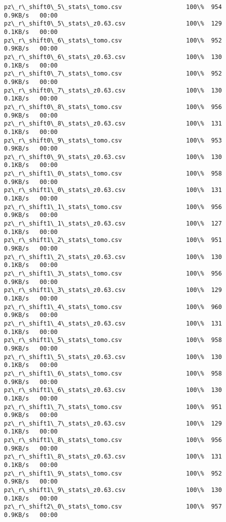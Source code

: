 \documentclass[11pt]{article}
\begin{document}
\begin{Verbatim}[commandchars=\\\{\}]
pz\_r\_shift0\_5\_stats\_tomo.csv                  100\%  954     0.9KB/s   00:00    
pz\_r\_shift0\_5\_stats\_z0.63.csv                 100\%  129     0.1KB/s   00:00    
pz\_r\_shift0\_6\_stats\_tomo.csv                  100\%  952     0.9KB/s   00:00    
pz\_r\_shift0\_6\_stats\_z0.63.csv                 100\%  130     0.1KB/s   00:00    
pz\_r\_shift0\_7\_stats\_tomo.csv                  100\%  952     0.9KB/s   00:00    
pz\_r\_shift0\_7\_stats\_z0.63.csv                 100\%  130     0.1KB/s   00:00    
pz\_r\_shift0\_8\_stats\_tomo.csv                  100\%  956     0.9KB/s   00:00    
pz\_r\_shift0\_8\_stats\_z0.63.csv                 100\%  131     0.1KB/s   00:00    
pz\_r\_shift0\_9\_stats\_tomo.csv                  100\%  953     0.9KB/s   00:00    
pz\_r\_shift0\_9\_stats\_z0.63.csv                 100\%  130     0.1KB/s   00:00    
pz\_r\_shift1\_0\_stats\_tomo.csv                  100\%  958     0.9KB/s   00:00    
pz\_r\_shift1\_0\_stats\_z0.63.csv                 100\%  131     0.1KB/s   00:00    
pz\_r\_shift1\_1\_stats\_tomo.csv                  100\%  956     0.9KB/s   00:00    
pz\_r\_shift1\_1\_stats\_z0.63.csv                 100\%  127     0.1KB/s   00:00    
pz\_r\_shift1\_2\_stats\_tomo.csv                  100\%  951     0.9KB/s   00:00    
pz\_r\_shift1\_2\_stats\_z0.63.csv                 100\%  130     0.1KB/s   00:00    
pz\_r\_shift1\_3\_stats\_tomo.csv                  100\%  956     0.9KB/s   00:00    
pz\_r\_shift1\_3\_stats\_z0.63.csv                 100\%  129     0.1KB/s   00:00    
pz\_r\_shift1\_4\_stats\_tomo.csv                  100\%  960     0.9KB/s   00:00    
pz\_r\_shift1\_4\_stats\_z0.63.csv                 100\%  131     0.1KB/s   00:00    
pz\_r\_shift1\_5\_stats\_tomo.csv                  100\%  958     0.9KB/s   00:00    
pz\_r\_shift1\_5\_stats\_z0.63.csv                 100\%  130     0.1KB/s   00:00    
pz\_r\_shift1\_6\_stats\_tomo.csv                  100\%  958     0.9KB/s   00:00    
pz\_r\_shift1\_6\_stats\_z0.63.csv                 100\%  130     0.1KB/s   00:00    
pz\_r\_shift1\_7\_stats\_tomo.csv                  100\%  951     0.9KB/s   00:00    
pz\_r\_shift1\_7\_stats\_z0.63.csv                 100\%  129     0.1KB/s   00:00    
pz\_r\_shift1\_8\_stats\_tomo.csv                  100\%  956     0.9KB/s   00:00    
pz\_r\_shift1\_8\_stats\_z0.63.csv                 100\%  131     0.1KB/s   00:00    
pz\_r\_shift1\_9\_stats\_tomo.csv                  100\%  952     0.9KB/s   00:00    
pz\_r\_shift1\_9\_stats\_z0.63.csv                 100\%  130     0.1KB/s   00:00    
pz\_r\_shift2\_0\_stats\_tomo.csv                  100\%  957     0.9KB/s   00:00    

\end{Verbatim}
\end{document}
